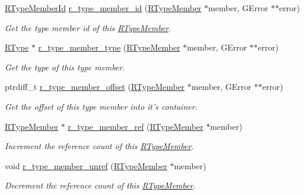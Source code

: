 \begin{DoxyCompactItemize}
\item 
\hyperlink{type__member_8h_a57b8dacec0c2e6283f307c07aae6fb7f}{R\-Type\-Member\-Id} \hyperlink{struct_r_type_member_af0e43672c62600335cb0569266feb221}{r\-\_\-type\-\_\-member\-\_\-id} (\hyperlink{struct_r_type_member}{R\-Type\-Member} $\ast$member, G\-Error $\ast$$\ast$error)
\begin{DoxyCompactList}\small\item\em Get the type member id of this \hyperlink{struct_r_type_member}{R\-Type\-Member}. \end{DoxyCompactList}\item 
\hyperlink{struct_r_type}{R\-Type} $\ast$ \hyperlink{struct_r_type_member_a179498126b0805889ffcd113dfdff8f4}{r\-\_\-type\-\_\-member\-\_\-type} (\hyperlink{struct_r_type_member}{R\-Type\-Member} $\ast$member, G\-Error $\ast$$\ast$error)
\begin{DoxyCompactList}\small\item\em Get the type of this type member. \end{DoxyCompactList}\item 
ptrdiff\-\_\-t \hyperlink{struct_r_type_member_af192de4185914c999d0445d6a2f424d1}{r\-\_\-type\-\_\-member\-\_\-offset} (\hyperlink{struct_r_type_member}{R\-Type\-Member} $\ast$member, G\-Error $\ast$$\ast$error)
\begin{DoxyCompactList}\small\item\em Get the offset of this type member into it's container. \end{DoxyCompactList}\item 
\hyperlink{struct_r_type_member}{R\-Type\-Member} $\ast$ \hyperlink{struct_r_type_member_aa097c4e561c9db8aaf141d6d0a163310}{r\-\_\-type\-\_\-member\-\_\-ref} (\hyperlink{struct_r_type_member}{R\-Type\-Member} $\ast$member)
\begin{DoxyCompactList}\small\item\em Increment the reference count of this \hyperlink{struct_r_type_member}{R\-Type\-Member}. \end{DoxyCompactList}\item 
void \hyperlink{struct_r_type_member_aab80f39862cb60904fef002d635173f3}{r\-\_\-type\-\_\-member\-\_\-unref} (\hyperlink{struct_r_type_member}{R\-Type\-Member} $\ast$member)
\begin{DoxyCompactList}\small\item\em Decrement the reference count of this \hyperlink{struct_r_type_member}{R\-Type\-Member}. \end{DoxyCompactList}\end{DoxyCompactItemize}



